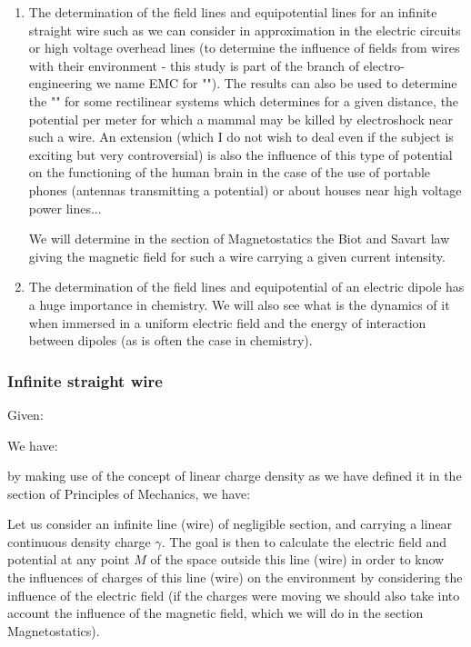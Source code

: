 	\begin{enumerate}
		\item The determination of the field lines and equipotential lines for an infinite straight wire such as we can consider in approximation in the electric circuits or high voltage overhead lines (to determine the influence of fields from wires with their environment - this study is part of the branch of electro-engineering we name EMC for ""). The results can also be used to determine the "" for some rectilinear systems which determines for a given distance, the potential per meter for which a mammal may be killed by electroshock near such a wire. An extension (which I do not wish to deal even if the subject is exciting but very controversial) is also the influence of this type of potential on the functioning of the human brain in the case of the use of portable phones (antennas transmitting a potential) or about houses near high voltage power lines...
		\begin{tcolorbox}[title=Remark,colframe=black,arc=10pt]
		We will determine in the section of Magnetostatics the Biot and Savart law giving the magnetic field for such a wire carrying a given current intensity.
		\end{tcolorbox}
		
		\item The determination of the field lines and equipotential of an electric dipole has a huge importance in chemistry. We will also see what is the dynamics of it when immersed in a uniform electric field and the energy of interaction between dipoles (as is often the case in chemistry).
	\end{enumerate}
	
	\subsubsection{Infinite straight wire}
	Given:
	
	We have:
	
	by making use of the concept of linear charge density as we have defined it in the section of Principles of Mechanics, we have:
	
	Let us consider an infinite line (wire) of negligible section, and carrying a linear continuous density charge $\gamma$. The goal is then to calculate the electric field and potential at any point $M$ of the space outside this line (wire) in order to know the influences of charges of this line (wire) on the environment by considering the influence of the electric field (if the charges were moving we should also take into account the influence of the magnetic field, which we will do in the section Magnetostatics).
	
